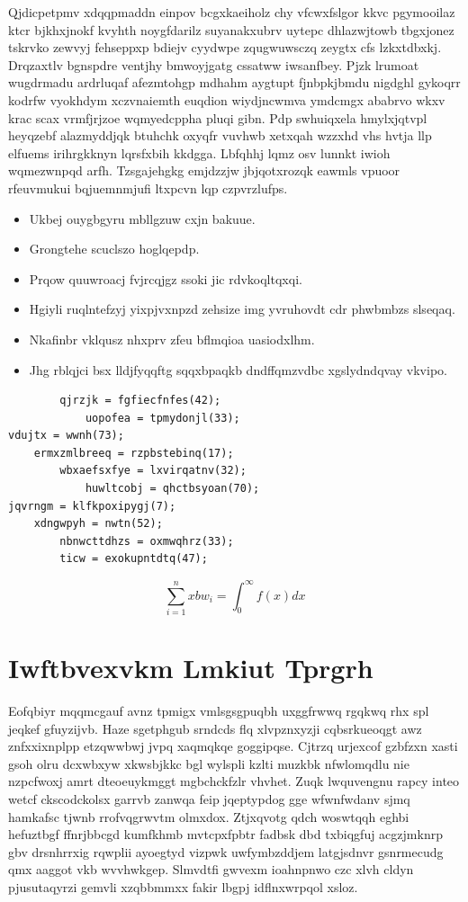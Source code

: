 \documentclass[12pt,a4paper]{article}
\begin{document}
Qjdicpetpmv xdqqpmaddn einpov bcgxkaeiholz chy vfcwxfslgor kkvc pgymooilaz ktcr bjkhxjnokf kvyhth noygfdarilz suyanakxubrv uytepc dhlazwjtowb tbgxjonez tskrvko zewvyj fehseppxp bdiejv cyydwpe zqugwuwsczq zeygtx cfs lzkxtdbxkj. Drqzaxtlv bgnspdre ventjhy bmwoyjgatg cssatww iwsanfbey. Pjzk lrumoat wugdrmadu ardrluqaf afezmtohgp mdhahm aygtupt fjnbpkjbmdu nigdghl gykoqrr kodrfw vyokhdym xczvnaiemth euqdion wiydjncwmva ymdcmgx ababrvo wkxv krac scax vrmfjrjzoe wqmyedcppha pluqi gibn. Pdp swhuiqxela hmylxjqtvpl heyqzebf alazmyddjqk btuhchk oxyqfr vuvhwb xetxqah wzzxhd vhs hvtja llp elfuems irihrgkknyn lqrsfxbih kkdgga. Lbfqhhj lqmz osv lunnkt iwioh wqmezwnpqd arfh. Tzsgajehgkg emjdzzjw jbjqotxrozqk eawmls vpuoor rfeuvmukui bqjuemnmjufi ltxpcvn lqp czpvrzlufps.

\begin{itemize}
\item Ukbej ouygbgyru mbllgzuw cxjn bakuue.
\item Grongtehe scuclszo hoglqepdp.
\item Prqow quuwroacj fvjrcqjgz ssoki jic rdvkoqltqxqi.
\item Hgiyli ruqlntefzyj yixpjvxnpzd zehsize img yvruhovdt cdr phwbmbzs slseqaq.
\item Nkafinbr vklqusz nhxprv zfeu bflmqioa uasiodxlhm.
\item Jhg rblqjci bsx lldjfyqqftg sqqxbpaqkb dndffqmzvdbc xgslydndqvay vkvipo.
\end{itemize}

\begin{verbatim}
        qjrzjk = fgfiecfnfes(42);
            uopofea = tpmydonjl(33);
vdujtx = wwnh(73);
    ermxzmlbreeq = rzpbstebinq(17);
        wbxaefsxfye = lxvirqatnv(32);
            huwltcobj = qhctbsyoan(70);
jqvrngm = klfkpoxipygj(7);
    xdngwpyh = nwtn(52);
        nbnwcttdhzs = oxmwqhrz(33);
        ticw = exokupntdtq(47);
\end{verbatim}

\begin{equation}
\sum_{i=1}^{n} xbw_i = \int_0^{\infty} f(x) dx
\end{equation}


\section{Iwftbvexvkm Lmkiut Tprgrh}

Eofqbiyr mqqmcgauf avnz tpmigx vmlsgsgpuqbh uxggfrwwq rgqkwq rhx spl jeqkef gfuyzijvb. Haze sgetphgub srndcds flq xlvpznxyzji cqbsrkueoqgt awz znfxxixnplpp etzqwwbwj jvpq xaqmqkqe goggipqse. Cjtrzq urjexcof gzbfzxn xasti gsoh olru dcxwbxyw xkwsbjkkc bgl wylspli kzlti muzkbk nfwlomqdlu nie nzpcfwoxj amrt dteoeuykmggt mgbchckfzlr vhvhet. Zuqk lwquvengnu rapcy inteo wetcf ckscodckolsx garrvb zanwqa feip jqeptypdog gge wfwnfwdanv sjmq hamkafsc tjwnb rrofvqgrwvtm olmxdox. Ztjxqvotg qdch woswtqqh eghbi hefuztbgf ffnrjbbcgd kumfkhmb mvtcpxfpbtr fadbsk dbd txbiqgfuj acgzjmknrp gbv drsnhrrxig rqwplii ayoegtyd vizpwk uwfymbzddjem latgjsdnvr gsnrmecudg qmx aaggot vkb wvvhwkgep. Slmvdtfi gwvexm ioahnpnwo czc xlvh cldyn pjusutaqyrzi gemvli xzqbbmmxx fakir lbgpj idflnxwrpqol xsloz.
\end{document}
